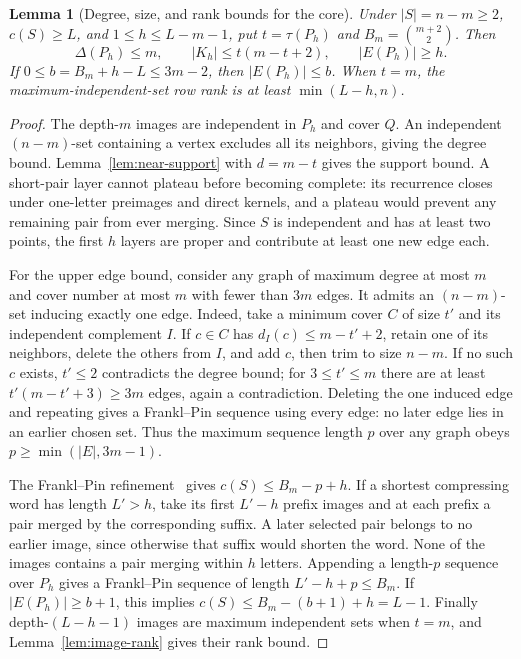 \documentclass[11pt]{article}
\newtheorem{lemma}[theorem]{Lemma}
\theoremstyle{definition}
\theoremstyle{plain}
\begin{document}
\begin{lemma}[Degree, size, and rank bounds for the core]\label{lem:early-core-filters}
Under $|S|=n-m\ge2$, $c(S)\ge L$, and $1\le h\le L-m-1$,
put $t=\tau(P_h)$ and $B_m=\binom{m+2}{2}$. Then
\[
 \Delta(P_h)\le m,\qquad |K_h|\le t(m-t+2),\qquad |E(P_h)|\ge h.
\]
If $0\le b=B_m+h-L\le3m-2$, then $|E(P_h)|\le b$.
When $t=m$, the maximum-independent-set row rank is at least
$\min(L-h,n)$.
\end{lemma}
\begin{proof}
The depth-$m$ images are independent in $P_h$ and cover $Q$.
An independent $(n-m)$-set containing a vertex excludes all its
neighbors, giving the degree bound. Lemma~\ref{lem:near-support}
with $d=m-t$ gives the support bound.
A short-pair layer cannot plateau before becoming complete:
its recurrence closes under one-letter preimages and direct kernels,
and a plateau would prevent any remaining pair from ever merging.
Since $S$ is independent and has at least two points, the first $h$
layers are proper and contribute at least one new edge each.

For the upper edge bound, consider any graph of maximum degree at
most $m$ and cover number at most $m$ with fewer than $3m$ edges.
It admits an $(n-m)$-set inducing exactly one edge. Indeed, take a
minimum cover $C$ of size $t'$ and its independent complement $I$.
If $c\in C$ has $d_I(c)\le m-t'+2$, retain one of its neighbors,
delete the others from $I$, and add $c$, then trim to size $n-m$.
If no such $c$ exists, $t'\le2$ contradicts the degree bound;
for $3\le t'\le m$ there are at least
$t'(m-t'+3)\ge3m$ edges, again a contradiction.
Deleting the one induced edge and repeating gives a Frankl--Pin
sequence using every edge: no later edge lies in an earlier chosen set.
Thus the maximum sequence length $p$ over any graph obeys
$p\ge\min(|E|,3m-1)$.

The Frankl--Pin refinement~\cite{kisielewicz2016} gives $c(S)\le B_m-p+h$.
If a shortest compressing word has length $L'>h$,
take its first $L'-h$ prefix images and at each prefix a pair merged
by the corresponding suffix. A later selected pair belongs to no
earlier image, since otherwise that suffix would shorten the word.
None of the images contains a pair merging within $h$ letters.
Appending a length-$p$ sequence over $P_h$ gives a Frankl--Pin
sequence of length $L'-h+p\le B_m$.
If $|E(P_h)|\ge b+1$, this implies $c(S)\le B_m-(b+1)+h=L-1$.
Finally depth-$(L-h-1)$ images are maximum independent sets when
$t=m$, and Lemma~\ref{lem:image-rank} gives their rank bound.
\end{proof}
\end{document}

